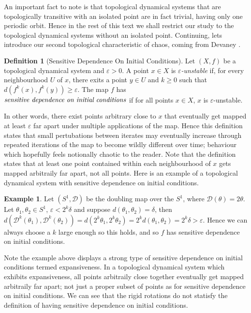 \documentclass[11pt,a4paper,oneside]{memoir}
\theoremstyle{plain}
\theoremstyle{definition}
\newtheorem{defn}[thm]{Definition}
\newtheorem{exmp}[thm]{Example}
\begin{document}
An important fact to note is that topological dynamical systems that are topologically transitive with an isolated point are in fact trivial, having only one periodic orbit. Hence in the rest of this text we shall restrict our study to the topological dynamical systems without an isolated point. Continuing, lets introduce our second topological characteristic of chaos, coming from Devaney \cite{devaney}.

\begin{defn}[Sensitive Dependence On Initial Conditions] \label{defn:sensitive-dependence}
    Let $(X, f)$ be a topological dynamical system and $\varepsilon > 0$. A point $x \in X$ is \emph{$\varepsilon$-unstable} if, for every neighbourhood $U$ of $x$, there exits a point $y \in U$ and $k \geq 0$ such that $d\left(f^k(x), f^k(y)\right) \geq \varepsilon$. The map $f$ has $\emph{sensitive dependence on initial conditions}$ if for all points $x \in X$, $x$ is $\varepsilon$-unstable.
\end{defn}

In other words, there exist points arbitrary close to $x$ that eventually get mapped at least $\varepsilon$ far apart under multiple applications of the map. Hence this definition states that small pertubations between iterates may eventually increase through repeated iterations of the map to become wildly different over time; behaviour which hopefully feels notionally chaotic to the reader. Note that the definition states that at least one point contained within each neighbourhood of $x$ gets mapped arbitraily far apart, not all points. Here is an example of a topological dynamical system with sensitive dependence on initial conditions.

\begin{exmp} \label{exmp:doubling-map-s1-sensitive}
    Let $(S^1, \mathcal{D})$ be the doubling map over the $S^1$, where $\mathcal{D}(\theta) = 2\theta$. Let $\theta_1, \theta_2 \in S^1$, $\varepsilon < 2^k \delta$ and suppose $d(\theta_1, \theta_2) = \delta$, then $d\left(\mathcal{D}^k(\theta_1), \mathcal{D}^k(\theta_2)\right) =  d\left(2^k\theta_1, 2^k\theta_2\right) = 2^k d(\theta_1, \theta_2) = 2^k \delta > \varepsilon$. Hence we can always choose a $k$ large enough so this holds, and so $f$ has sensitive dependence on initial conditions.
\end{exmp}

Note the example above displays a strong type of sensitive dependence on initial conditions termed expansiveness. In a topological dynamical system which exhibits expansiveness, all points arbitraily close together eventually get mapped arbitraily far apart; not just a proper subset of points as for sensitive dependence on initial conditions. We can see that the rigid rotations do not statisfy the definition of having sensitive dependence on initial conditions.
\end{document}
